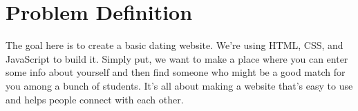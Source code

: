 \section{Problem Definition}

The goal here is to create a basic dating website. We're using HTML, CSS, and JavaScript to build it. Simply put, we want to make a place where you can enter some info about yourself and then find someone who might be a good match for you among a bunch of students. It's all about making a website that's easy to use and helps people connect with each other.





